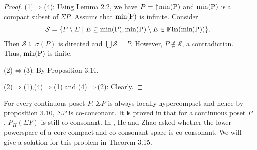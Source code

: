 \documentclass[preprint,12pt]{elsarticle}
\numberwithin{equation}{section}
\newcommand{\up}{\mathord{\uparrow}\hspace{0.05em}}
\begin{document}
\begin{proof}(1)$\Longrightarrow$(4): Using Lemma 2.2, we have $P=\up {\rm min(P)}$ and ${\rm min(P)}$ is a compact subset of $\Sigma P$. Assume that ${\rm min(P)}$ is infinite. Consider $$\mathcal{S}=\{P\setminus E\mid E\subseteq {\rm min(P)}, {\rm min(P)}\setminus E \in \mathbf{Fin}({\rm min(P)})\}.$$ Then $\mathcal{S}\subseteq\sigma(P)$ is directed and $\bigcup \mathcal{S}=P$. However, $P\not\in \mathcal{S}$, a contradiction. Thus, ${\rm min(P)}$ is finite.

(2)$\Longleftrightarrow$(3): By Proposition 3.10.

(2)$\Longrightarrow$(1),(4)$\Longrightarrow$(1) and (4)$\Longrightarrow$(2): Clearly.
\end{proof}

\quad  For every continuous poset $P$, $\Sigma P$ is always locally hypercompact and hence by proposition 3.10, $\Sigma P$ is co-consonant. It is proved in \cite {BWR30} that for a continuous poset $P$, $P_{H}(\Sigma P)$ is still co-consonant. In \cite {BWR30}, He and Zhao asked whether the lower powerspace of a core-compact and co-consonant space is co-consonant. We will give a solution for this problem in Theorem 3.15.
\end{document}
